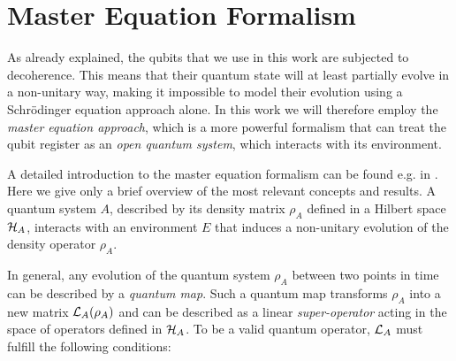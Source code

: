 \section{Master Equation Formalism} \label{section:master_equation}

As already explained, the qubits that we use in this work are subjected to decoherence. This means that their quantum state will at least partially evolve in a non-unitary way, making it impossible to model their evolution using a Schrödinger equation approach alone. In this work we will therefore employ the {\it master equation approach}, which is a more powerful formalism that can treat the qubit register as an {\it open quantum system}, which interacts with its environment.

\smallskip

A detailed introduction to the master equation formalism can be found e.g. in \citep{haroche_exploring_2006}. Here we give only a brief overview of the most relevant concepts and results. A quantum system $A$, described by its density matrix $\rho_A$ defined in a Hilbert space $\begin{mathcal}H\end{mathcal}_A$, interacts with an environment $E$ that induces a non-unitary evolution of the density operator $\rho_A$. 

\smallskip

In general, any evolution of the quantum system $\rho_A$ between two points in time can be described by a {\it quantum map}. Such a quantum map transforms $\rho_A$ into a new matrix $\LA{A}(\rho_A)$ and can be described as a linear {\it super-operator} acting in the space of operators defined in $\begin{mathcal}H\end{mathcal}_A$. To be a valid quantum operator, $\begin{mathcal}L\end{mathcal}_A$ must fulfill the following conditions:

